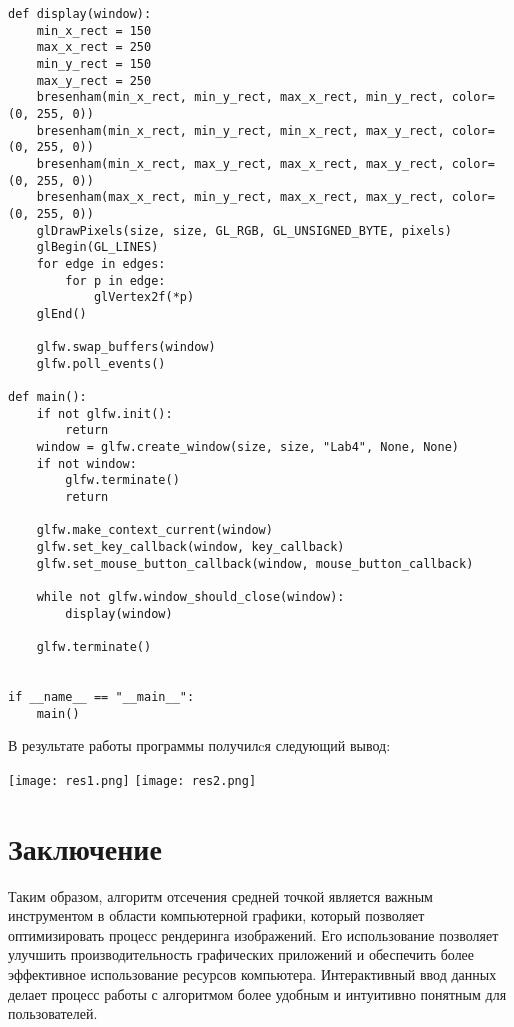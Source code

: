 \documentclass[a4paper, 14pt]{extarticle}
\begin{document}
\begin{lstlisting}
def display(window):
    min_x_rect = 150
    max_x_rect = 250
    min_y_rect = 150
    max_y_rect = 250
    bresenham(min_x_rect, min_y_rect, max_x_rect, min_y_rect, color=(0, 255, 0))
    bresenham(min_x_rect, min_y_rect, min_x_rect, max_y_rect, color=(0, 255, 0))
    bresenham(min_x_rect, max_y_rect, max_x_rect, max_y_rect, color=(0, 255, 0))
    bresenham(max_x_rect, min_y_rect, max_x_rect, max_y_rect, color=(0, 255, 0))
    glDrawPixels(size, size, GL_RGB, GL_UNSIGNED_BYTE, pixels)
    glBegin(GL_LINES)
    for edge in edges:
        for p in edge:
            glVertex2f(*p)
    glEnd()

    glfw.swap_buffers(window)
    glfw.poll_events()

def main():
    if not glfw.init():
        return
    window = glfw.create_window(size, size, "Lab4", None, None)
    if not window:
        glfw.terminate()
        return

    glfw.make_context_current(window)
    glfw.set_key_callback(window, key_callback)
    glfw.set_mouse_button_callback(window, mouse_button_callback)

    while not glfw.window_should_close(window):
        display(window)

    glfw.terminate()


if __name__ == "__main__":
    main()
\end{lstlisting}
В результате работы программы получилcя следующий вывод:
\begin{center}
    \texttt{[image: res1.png]}
    \newpage
    \texttt{[image: res2.png]}
\end{center}
\pagebreak

\section{Заключение}
\par
Таким образом, алгоритм отсечения средней точкой является важным инструментом в области компьютерной графики, который позволяет оптимизировать процесс рендеринга изображений. Его использование позволяет улучшить производительность графических приложений и обеспечить более эффективное использование ресурсов компьютера. Интерактивный ввод данных делает процесс работы с алгоритмом более удобным и интуитивно понятным для пользователей.
\end{document}
